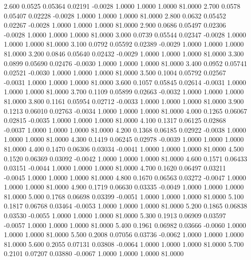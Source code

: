    2.600   0.0525   0.05364   0.02191  -0.0028   1.0000   1.0000   1.0000  81.0000
   2.700   0.0578   0.05407   0.02228  -0.0028   1.0000   1.0000   1.0000  81.0000
   2.800   0.0632   0.05452   0.02267  -0.0028   1.0000   1.0000   1.0000  81.0000
   2.900   0.0686   0.05497   0.02306  -0.0028   1.0000   1.0000   1.0000  81.0000
   3.000   0.0739   0.05544   0.02347  -0.0028   1.0000   1.0000   1.0000  81.0000
   3.100   0.0792   0.05592   0.02389  -0.0029   1.0000   1.0000   1.0000  81.0000
   3.200   0.0846   0.05640   0.02432  -0.0029   1.0000   1.0000   1.0000  81.0000
   3.300   0.0899   0.05690   0.02476  -0.0030   1.0000   1.0000   1.0000  81.0000
   3.400   0.0952   0.05741   0.02521  -0.0030   1.0000   1.0000   1.0000  81.0000
   3.500   0.1004   0.05792   0.02567  -0.0031   1.0000   1.0000   1.0000  81.0000
   3.600   0.1057   0.05845   0.02614  -0.0031   1.0000   1.0000   1.0000  81.0000
   3.700   0.1109   0.05899   0.02663  -0.0032   1.0000   1.0000   1.0000  81.0000
   3.800   0.1161   0.05954   0.02712  -0.0033   1.0000   1.0000   1.0000  81.0000
   3.900   0.1213   0.06010   0.02763  -0.0034   1.0000   1.0000   1.0000  81.0000
   4.000   0.1265   0.06067   0.02815  -0.0035   1.0000   1.0000   1.0000  81.0000
   4.100   0.1317   0.06125   0.02868  -0.0037   1.0000   1.0000   1.0000  81.0000
   4.200   0.1368   0.06185   0.02922  -0.0038   1.0000   1.0000   1.0000  81.0000
   4.300   0.1419   0.06245   0.02978  -0.0039   1.0000   1.0000   1.0000  81.0000
   4.400   0.1470   0.06306   0.03034  -0.0041   1.0000   1.0000   1.0000  81.0000
   4.500   0.1520   0.06369   0.03092  -0.0042   1.0000   1.0000   1.0000  81.0000
   4.600   0.1571   0.06433   0.03151  -0.0044   1.0000   1.0000   1.0000  81.0000
   4.700   0.1620   0.06497   0.03211  -0.0045   1.0000   1.0000   1.0000  81.0000
   4.800   0.1670   0.06563   0.03272  -0.0047   1.0000   1.0000   1.0000  81.0000
   4.900   0.1719   0.06630   0.03335  -0.0049   1.0000   1.0000   1.0000  81.0000
   5.000   0.1768   0.06698   0.03399  -0.0051   1.0000   1.0000   1.0000  81.0000
   5.100   0.1817   0.06768   0.03464  -0.0053   1.0000   1.0000   1.0000  81.0000
   5.200   0.1865   0.06838   0.03530  -0.0055   1.0000   1.0000   1.0000  81.0000
   5.300   0.1913   0.06909   0.03597  -0.0057   1.0000   1.0000   1.0000  81.0000
   5.400   0.1961   0.06982   0.03666  -0.0060   1.0000   1.0000   1.0000  81.0000
   5.500   0.2008   0.07056   0.03736  -0.0062   1.0000   1.0000   1.0000  81.0000
   5.600   0.2055   0.07131   0.03808  -0.0064   1.0000   1.0000   1.0000  81.0000
   5.700   0.2101   0.07207   0.03880  -0.0067   1.0000   1.0000   1.0000  81.0000
